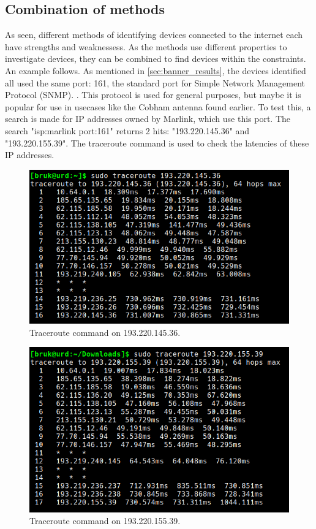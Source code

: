 \subsection{Combination of methods} \label{sec:combo}
As seen, different methods of identifying devices connected to the internet each have strengths and weaknessess. As the methods use different properties to investigate devices, they can be combined to find devices within the constraints. An example follows.
As mentioned in \cref{sec:banner_results}, the devices identified all used the same port: 161, the standard port for Simple Network Management Protocol (SNMP). \cite{www_ports}. This protocol is used for general purposes, but maybe it is popular for use in usecases like the Cobham antenna found earlier. To test this, a search is made for IP addresses owned by Marlink, which use this port. The search "isp:marlink port:161" returns 2 hits: "193.220.145.36" and "193.220.155.39". The traceroute command is used to check the latencies of these IP addresses.

\begin{figure} [H]
    \centering
    \includegraphics[scale=0.4]{Figurer/marlink_161_2.png}
    \caption{Traceroute command on 193.220.145.36.}
    \label{fig:marlink_traceroute_2}
\end{figure}

\begin{figure} [H]
    \centering
    \includegraphics[scale=0.4]{Figurer/marlink_161_1.png}
    \caption{Traceroute command on 193.220.155.39.}
    \label{fig:marlink_traceroute_1}
\end{figure}


